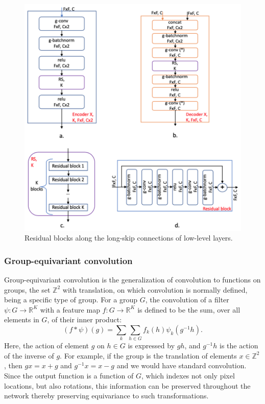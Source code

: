 \begin{figure}[thb]
    \centering
    \includegraphics[scale=0.95]{resources/4_UNet_Architecture-part2.png}
    \caption{Residual blocks along the long-skip connections of low-level layers.}
    \label{fig:g_u_net_details}
\end{figure}

\subsubsection*{Group-equivariant convolution}
Group-equivariant convolution is the generalization of convolution to functions on groups, the set $\mathbb{Z}^{2}$ with translation, on which convolution is normally defined, being a specific type of group.
For a group $G$, the convolution of a filter $\psi\colon G\rightarrow \mathbb{R}^{K}$ with a feature map $f\colon G\rightarrow \mathbb{R}^{K}$  is defined to be the sum, over all elements in $G$, of their inner product:
\begin{equation}
    (f\ast \psi)(g) = \sum_{k}\sum_{h\in G} f_{k}(h)\psi_{k}(g^{-1}h).
\end{equation}
Here, the action of element $g$ on $h\in G$ is expressed by $gh$, and $g^{-1}h$ is the action of the inverse of $g$.
For example, if the group is the translation of elements $x\in\mathbb{Z}^{2}$, then $gx = x + g$ and $g^{-1}x = x - g$ and we would have standard convolution.
Since the output function is a function of $G$, which indexes not only pixel locations, but also rotations, this information can be preserved throughout the network thereby preserving equivariance to such transformations.

